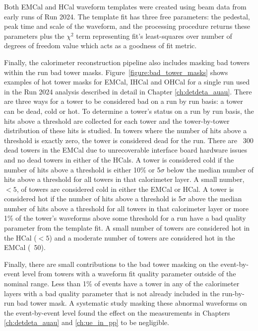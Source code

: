 Both EMCal and HCal waveform templates were created using beam data from early runs of Run 2024. 
The template fit has three free parameters: the pedestal, peak time and scale of the waveform, and the processing procedure returns these parameters plus the $\chi^{2}$ term representing fit's least-squares over number of degrees of freedom value which acts as a goodness of fit metric. 

Finally, the calorimeter reconstruction pipeline also includes masking bad towers within the run bad tower masks.
Figure~\ref{figure:bad_tower_masks} shows examples of hot tower masks for EMCal, IHCal and OHCal for a single run used in the Run 2024 \auau{} analysis described in detail in Chapter \ref{ch:detdeta_auau}.
There are three ways for a tower to be considered bad on a run by run basis: a tower can be dead, cold or hot.
To determine a tower's status on a run by run basis, the hits above a threshold are collected for each tower and the tower-by-tower distribution of these hits is studied.
In towers where the number of hits above a threshold is exactly zero, the tower is considered dead for the run. 
There are ~300 dead towers in the EMCal due to unrecoverable interface board hardware issues and no dead towers in either of the HCals.
A tower is considered cold if the number of hits above a threshold is either 10\% or 5$\sigma$ below the median number of hits above a threshold for all towers in that calorimeter layer. 
A small number, $< 5$, of towers are considered cold in either the EMCal or HCal. 
A tower is considered hot if the number of hits above a threshold is 5$\sigma$ above the median number of hits above a threshold for all towers in that calorimeter layer or more 1\% of the tower's waveforms above some threshold for a run have a bad quality parameter from the template fit. 
A small number of towers are considered hot in the HCal ($< 5$) and a moderate number of towers are considered hot in the EMCal (~50).

Finally, there are small contributions to the bad tower masking on the event-by-event level from towers with a waveform fit quality parameter outside of the nominal range. 
Less than 1\% of events have a tower in any of the calorimeter layers with a bad quality parameter that is not already included in the run-by-run bad tower mask. 
A systematic study masking these abnormal waveforms on the event-by-event level found the effect on the measurements in Chapters \ref{ch:detdeta_auau} and \ref{ch:ue_in_pp} to be negligible. 

